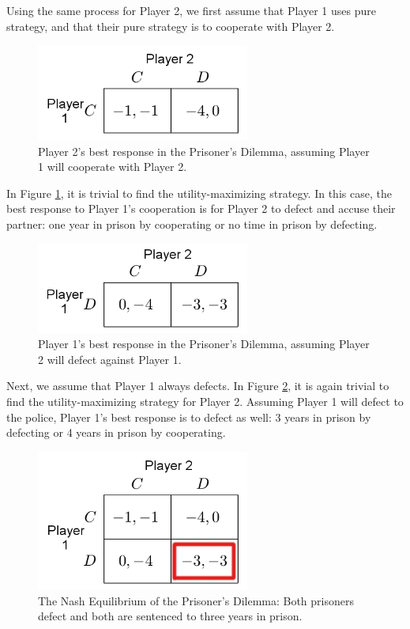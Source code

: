 Using the same process for Player 2, we first assume that Player 1 uses pure strategy, and that their pure strategy is to cooperate with Player 2.
\begin{figure}[H]
  \centering
  \includegraphics[width=7cm]{figures/ExamplePartialRow1.png}
  \caption{Player 2's best response in the Prisoner's Dilemma, assuming Player 1 will cooperate with Player 2.}
  \label{fig:NashRow1}
\end{figure}

In Figure \ref{fig:NashRow1}, it is trivial to find the utility-maximizing strategy. In this case, the best response to Player 1's cooperation is for Player 2 to defect and accuse their partner: one year in prison by cooperating or no time in prison by defecting.\\

\begin{figure}[H]
  \centering
  \includegraphics[width=7cm]{figures/ExamplePartialRow2.png}
  \caption{Player 1's best response in the Prisoner's Dilemma, assuming Player 2 will defect against Player 1.}
  \label{fig:NashRow2}
\end{figure}
Next, we assume that Player 1 always defects. In Figure \ref{fig:NashRow2}, it is again trivial to find the utility-maximizing strategy for Player 2. Assuming Player 1 will defect to the police, Player 1's best response is to defect as well: 3 years in prison by defecting or 4 years in prison by cooperating.\\

\begin{figure}[H]
  \centering
  \includegraphics[width=7cm]{figures/ExampleNashEquilibrium.png}
  \caption{The Nash Equilibrium of the Prisoner's Dilemma: Both prisoners defect and both are sentenced to three years in prison.}
  \label{fig:NashEquil}
\end{figure}

